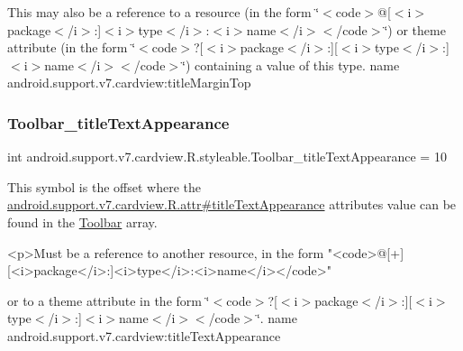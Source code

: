 This may also be a reference to a resource (in the form \char`\"{}$<$code$>$@\mbox{[}$<$i$>$package$<$/i$>$\+:\mbox{]}$<$i$>$type$<$/i$>$\+:$<$i$>$name$<$/i$>$$<$/code$>$\char`\"{}) or theme attribute (in the form \char`\"{}$<$code$>$?\mbox{[}$<$i$>$package$<$/i$>$\+:\mbox{]}\mbox{[}$<$i$>$type$<$/i$>$\+:\mbox{]}$<$i$>$name$<$/i$>$$<$/code$>$\char`\"{}) containing a value of this type.  name android.\+support.\+v7.\+cardview\+:title\+Margin\+Top \mbox{\label{classandroid_1_1support_1_1v7_1_1cardview_1_1R_1_1styleable_a0550b9c219eb26f50afa2d0709195a54}} 
\subsubsection{\texorpdfstring{Toolbar\+\_\+title\+Text\+Appearance}{Toolbar\_titleTextAppearance}}
{\footnotesize\ttfamily int android.\+support.\+v7.\+cardview.\+R.\+styleable.\+Toolbar\+\_\+title\+Text\+Appearance = 10\hspace{0.3cm}{\ttfamily [static]}}

This symbol is the offset where the \hyperlink{classandroid_1_1support_1_1v7_1_1cardview_1_1R_1_1attr_af05d7a19e10d8dc2559fa9ea74564708}{android.\+support.\+v7.\+cardview.\+R.\+attr\#title\+Text\+Appearance} attribute\textquotesingle{}s value can be found in the \hyperlink{classandroid_1_1support_1_1v7_1_1cardview_1_1R_1_1styleable_a26149aeb8fd339abe09ecc9d92b9304f}{Toolbar} array.

\begin{DoxyVerb}      <p>Must be a reference to another resource, in the form "<code>@[+][<i>package</i>:]<i>type</i>:<i>name</i></code>"
\end{DoxyVerb}
 or to a theme attribute in the form \char`\"{}$<$code$>$?\mbox{[}$<$i$>$package$<$/i$>$\+:\mbox{]}\mbox{[}$<$i$>$type$<$/i$>$\+:\mbox{]}$<$i$>$name$<$/i$>$$<$/code$>$\char`\"{}.  name android.\+support.\+v7.\+cardview\+:title\+Text\+Appearance \mbox{\label{classandroid_1_1support_1_1v7_1_1cardview_1_1R_1_1styleable_a575dc8e25cd7d21b6d8b14cae397fdae}} 
